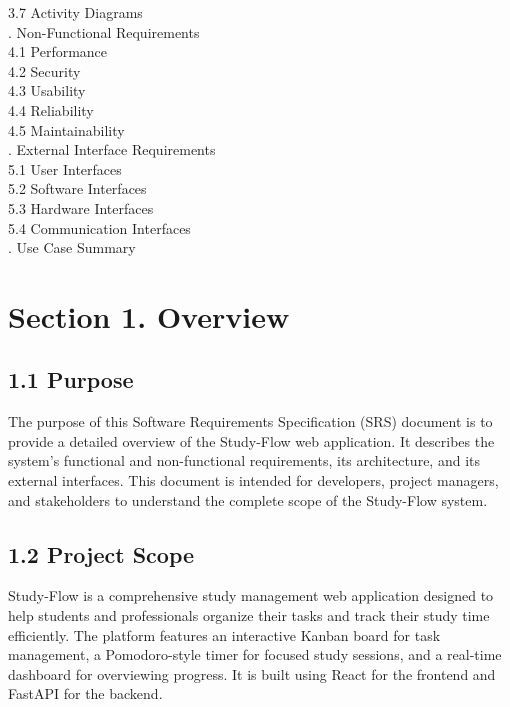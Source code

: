 \documentclass[12pt]{article}
\begin{document}
\hspace*{1cm}3.7 Activity Diagrams\\[0.3cm]
. Non-Functional Requirements\\[0.3cm]
\hspace*{1cm}4.1 Performance\\[0.3cm]
\hspace*{1cm}4.2 Security\\[0.3cm]
\hspace*{1cm}4.3 Usability\\[0.3cm]
\hspace*{1cm}4.4 Reliability\\[0.3cm]
\hspace*{1cm}4.5 Maintainability\\[0.3cm]
. External Interface Requirements\\[0.3cm]
\hspace*{1cm}5.1 User Interfaces\\[0.3cm]
\hspace*{1cm}5.2 Software Interfaces\\[0.3cm]
\hspace*{1cm}5.3 Hardware Interfaces\\[0.3cm]
\hspace*{1cm}5.4 Communication Interfaces\\[0.3cm]
. Use Case Summary\\[0.3cm]

\newpage
\section*{Section 1. Overview}

\subsection*{1.1 Purpose}
The purpose of this Software Requirements Specification (SRS) document is to provide a detailed overview of the Study-Flow web application. It describes the system's functional and non-functional requirements, its architecture, and its external interfaces. This document is intended for developers, project managers, and stakeholders to understand the complete scope of the Study-Flow system.

\subsection*{1.2 Project Scope}
Study-Flow is a comprehensive study management web application designed to help students and professionals organize their tasks and track their study time efficiently. The platform features an interactive Kanban board for task management, a Pomodoro-style timer for focused study sessions, and a real-time dashboard for overviewing progress. It is built using React for the frontend and FastAPI for the backend.
\end{document}
